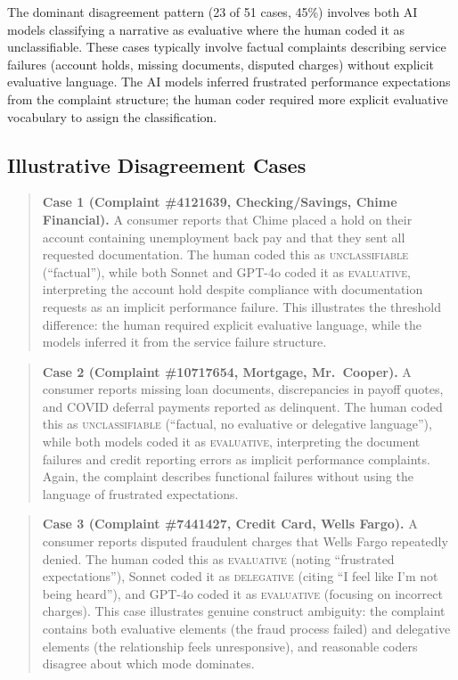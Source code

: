 The dominant disagreement pattern (23 of 51 cases, 45\%) involves both AI models classifying a narrative as evaluative where the human coded it as unclassifiable. These cases typically involve factual complaints describing service failures (account holds, missing documents, disputed charges) without explicit evaluative language. The AI models inferred frustrated performance expectations from the complaint structure; the human coder required more explicit evaluative vocabulary to assign the classification.

\subsection{Illustrative Disagreement Cases}

\begin{quote}
\textbf{Case 1 (Complaint \#4121639, Checking/Savings, Chime Financial).} A consumer reports that Chime placed a hold on their account containing unemployment back pay and that they sent all requested documentation. The human coded this as \textsc{unclassifiable} (``factual''), while both Sonnet and GPT-4o coded it as \textsc{evaluative}, interpreting the account hold despite compliance with documentation requests as an implicit performance failure. This illustrates the threshold difference: the human required explicit evaluative language, while the models inferred it from the service failure structure.
\end{quote}

\begin{quote}
\textbf{Case 2 (Complaint \#10717654, Mortgage, Mr.\ Cooper).} A consumer reports missing loan documents, discrepancies in payoff quotes, and COVID deferral payments reported as delinquent. The human coded this as \textsc{unclassifiable} (``factual, no evaluative or delegative language''), while both models coded it as \textsc{evaluative}, interpreting the document failures and credit reporting errors as implicit performance complaints. Again, the complaint describes functional failures without using the language of frustrated expectations.
\end{quote}

\begin{quote}
\textbf{Case 3 (Complaint \#7441427, Credit Card, Wells Fargo).} A consumer reports disputed fraudulent charges that Wells Fargo repeatedly denied. The human coded this as \textsc{evaluative} (noting ``frustrated expectations''), Sonnet coded it as \textsc{delegative} (citing ``I feel like I'm not being heard''), and GPT-4o coded it as \textsc{evaluative} (focusing on incorrect charges). This case illustrates genuine construct ambiguity: the complaint contains both evaluative elements (the fraud process failed) and delegative elements (the relationship feels unresponsive), and reasonable coders disagree about which mode dominates.
\end{quote}

